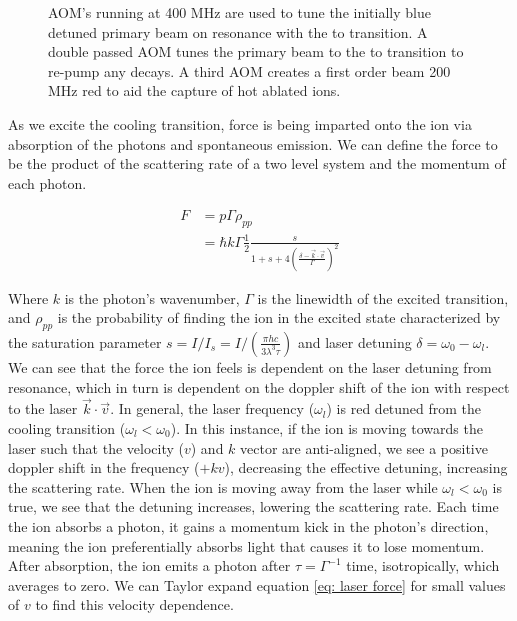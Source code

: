\begin{figure}[H]
	\centering
	\caption{AOM's running at 400 MHz are used to tune the initially blue detuned primary beam on resonance with the  to  transition. A double passed AOM tunes the primary beam to the  to  transition to re-pump any  decays. A third AOM creates a first order beam 200 MHz red to aid the capture of hot ablated  ions.}
	\label{fig: AOMs}
\end{figure}

As we excite the cooling transition, force is being imparted onto the ion via absorption of the photons and spontaneous emission. We can define the force to be the product of the scattering rate of a two level system and the momentum of each photon.

\begin{align}
	F & = p \Gamma \rho_{pp} \nonumber \\
	& = \hbar k \Gamma \frac{1}{2} \frac{s}{1+s+4\left(\frac{\delta-\vec{k}\cdot \vec{v}}{\Gamma}\right)^2} \label{eq: laser force}
\end{align}

Where $k$ is the photon's wavenumber, $\Gamma$ is the linewidth of the excited transition, and $\rho_{pp}$ is the probability of finding the ion in the excited  state characterized by the saturation parameter $s = I/I_s=I/(\frac{\pi h c}{3 \lambda^3 \tau})$ and laser detuning $\delta=\omega_0-\omega_l$. We can see that the force the ion feels is dependent on the laser detuning from resonance, which in turn is dependent on the doppler shift of the ion with respect to the laser $\vec{k} \cdot \vec{v}$. In general, the laser frequency ($\omega_l$) is red detuned from the cooling transition ($\omega_l < \omega_0$). In this instance, if the ion is moving towards the laser such that the velocity ($v$) and $k$ vector are anti-aligned, we see a positive doppler shift in the frequency ($+kv$), decreasing the effective detuning, increasing the scattering rate. When the ion is moving away from the laser while $\omega_l < \omega_0$ is true, we see that the detuning increases, lowering the scattering rate. Each time the ion absorbs a photon, it gains a momentum kick in the photon's direction, meaning the ion preferentially absorbs light that causes it to lose momentum. After absorption, the ion emits a photon after $\tau=\Gamma^{-1}$ time, isotropically, which averages to zero. We can Taylor expand equation \ref{eq: laser force} for small values of $v$ to find this velocity dependence.

